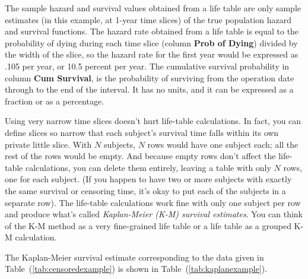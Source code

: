 \documentclass[a4paper,11pt]{article}
\begin{document}
The sample hazard and survival values obtained from a life table are only sample estimates (in this example, at 1-year time slices) of the true population hazard and survival functions.
The hazard rate obtained from a life table is equal to the probability of dying during each time slice (column \textbf{Prob of Dying}) divided by the width of the slice, so the hazard rate for the first year would be expressed as .105 per year, or 10.5 percent per year. The 
cumulative survival probability in column \textbf{Cum Survival}, is the probability of surviving from the operation date through to the end of the interval. It has no units, and it can be expressed as a fraction or as a percentage. 


Using very narrow time slices doesn't hurt life-table calculations. In fact, you can define slices so narrow that each subject's survival time falls within its own private little slice. With $N$ subjects, $N$ rows would have one subject each; all the rest of the rows would be empty. And because empty rows don't affect the life-table calculations, you can delete them entirely, leaving a table with only $N$ rows, one for each subject. 
(If you happen to have two or more subjects with exactly the same survival or censoring time, it's okay to put each of the subjects in a separate row). The life-table calculations work fine with only one subject per row and produce what's called \textit{Kaplan-Meier (K-M) survival estimates}.
You can think of the K-M method as a very fine-grained life table or a life table as a grouped K-M calculation.

The Kaplan-Meier survival estimate corresponding to the data given in Table~(\ref{tab:censoredexample}) is shown in Table~(\ref{tab:kaplanexample}).
\end{document}
